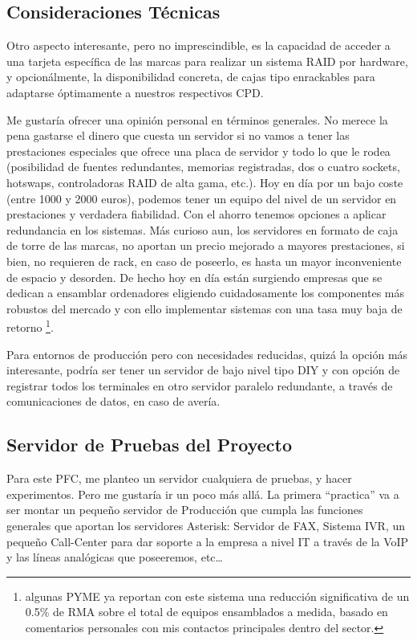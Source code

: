 \subsection{Consideraciones Técnicas}

Otro aspecto interesante, pero no imprescindible, es la capacidad de acceder a una tarjeta específica de las marcas para realizar un sistema RAID por hardware, y opcionálmente, la disponibilidad concreta, de cajas tipo enrackables para adaptarse óptimamente a nuestros respectivos CPD.

Me gustaría ofrecer una opinión personal en términos generales. No merece la pena gastarse el dinero que cuesta un servidor si no vamos a tener las prestaciones especiales que ofrece una placa de servidor y todo lo que le rodea (posibilidad de fuentes redundantes, memorias registradas, dos o cuatro sockets, hotswaps, controladoras RAID de alta gama, etc.). Hoy en día por un bajo coste (entre 1000 y 2000 euros), podemos tener un equipo del nivel de un servidor en prestaciones y verdadera fiabilidad. Con el ahorro tenemos opciones a aplicar redundancia en los sistemas. Más curioso aun, los servidores en formato de caja de torre de las marcas, no aportan un precio mejorado a mayores prestaciones, si bien, no requieren de rack, en caso de poseerlo, es hasta un mayor inconveniente de espacio y desorden. De hecho hoy en día están surgiendo empresas que se dedican a ensamblar ordenadores eligiendo cuidadosamente los componentes más robustos del mercado y con ello implementar sistemas con una tasa muy baja de retorno \footnote{algunas PYME ya reportan con este sistema una reducción significativa de un 0.5\% de RMA sobre el total de equipos ensamblados a medida, basado en comentarios personales con mis contactos principales dentro del sector.}.

Para entornos de producción pero con necesidades reducidas, quizá la opción más interesante, podría ser tener un servidor de bajo nivel tipo DIY y con opción de registrar todos los terminales en otro servidor paralelo redundante, a través de comunicaciones de datos, en caso de avería.

\subsection{Servidor de Pruebas del Proyecto}

Para este PFC, me planteo un servidor cualquiera de pruebas, y hacer experimentos. Pero me gustaría ir un poco más allá. La primera “practica” va a ser montar un pequeño servidor de Producción que cumpla las funciones generales que aportan los servidores Asterisk: Servidor de FAX, Sistema IVR, un pequeño Call-Center para dar soporte a la empresa a nivel IT a través de la VoIP y las líneas analógicas que poseeremos, etc…

